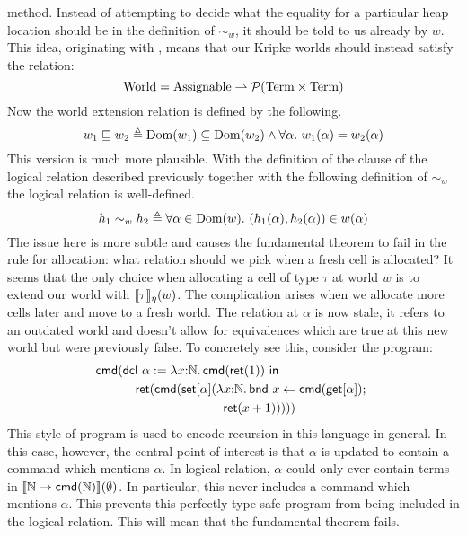 method. Instead of attempting to decide what the equality for a
particular heap location should be in the definition of $\sim_w$, it
should be told to us already by $w$. This idea, originating with
\citet{TODO-PITTS-AND-STARK}, means that our Kripke worlds should
instead satisfy the relation:
\[
  \mathrm{World} = \mathrm{Assignable} \rightharpoonup \mathcal{P}(\mathrm{Term} \times \mathrm{Term})
\]
Now the world extension relation is defined by the following.
\[
  w_1 \mathrel{\sqsubseteq} w_2 \triangleq
  \operatorname{Dom}(w_1) \subseteq \operatorname{Dom}(w_2) \land
  \forall \alpha.\ w_1(\alpha) = w_2(\alpha)
\]
This version is much more plausible. With the definition of the clause
of the logical relation described previously together with the
following definition of $\sim_w$ the logical relation is well-defined.
\[
  h_1 \sim_w h_2 \triangleq \forall \alpha \in \operatorname{Dom}(w).
  \  (h_1(\alpha), h_2(\alpha)) \in w(\alpha)
\]
The issue here is more subtle and causes the fundamental theorem to
fail in the rule for allocation: what relation should we pick when a
fresh cell is allocated? It seems that the only choice when allocating
a cell of type $\tau$ at world $w$ is to extend our world with
$\llbracket \tau \rrbracket_\eta(w)$. The complication arises when we allocate more
cells later and move to a fresh world. The relation at $\alpha$ is now
stale, it refers to an outdated world and doesn't allow for
equivalences which are true at this new world but were previously
false. To concretely see this, consider the program:
\begin{align*}
  \cmd{
    &\dcl{\alpha}{\lam{x}{\nat}{\cmd{\ret{1}}}}{\\
      &\quad \ret{\cmd{\set{\alpha}{\lam{x}{\nat}{
          \bnd{x}{\cmd{\get{\alpha}}}{\\ & \qquad\qquad\qquad\qquad\ret{x + 1}}
        }}}}
    }
  }
\end{align*}
This style of program is used to encode recursion in this language in
general. In this case, however, the central point of interest is that
$\alpha$ is updated to contain a command which mentions $\alpha$. In
logical relation, $\alpha$ could only ever contain terms in
$\llbracket \mathbb{N} \to \mathsf{cmd}(\mathbb{N}) \rrbracket(\emptyset)$. In particular, this never
includes a command which mentions $\alpha$. This prevents this
perfectly type safe program from being included in the logical
relation. This will mean that the fundamental theorem fails.

